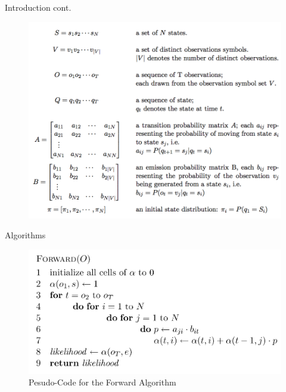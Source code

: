 \documentclass[11pt]{beamer}
\begin{document}
\begin{frame}{Introduction cont.}
\begin{figure}
\includegraphics[scale=0.25]{"symbols"}
\end{figure}
\end{frame}

\begin{frame}{Algorithms}
\begin{figure}[H]

\centering
\includegraphics[scale=0.4]{"FW"}
 \caption{Pesudo-Code for the Forward Algorithm \cite{cuhmm}}

\end{figure}

\end{frame}
\end{document}
